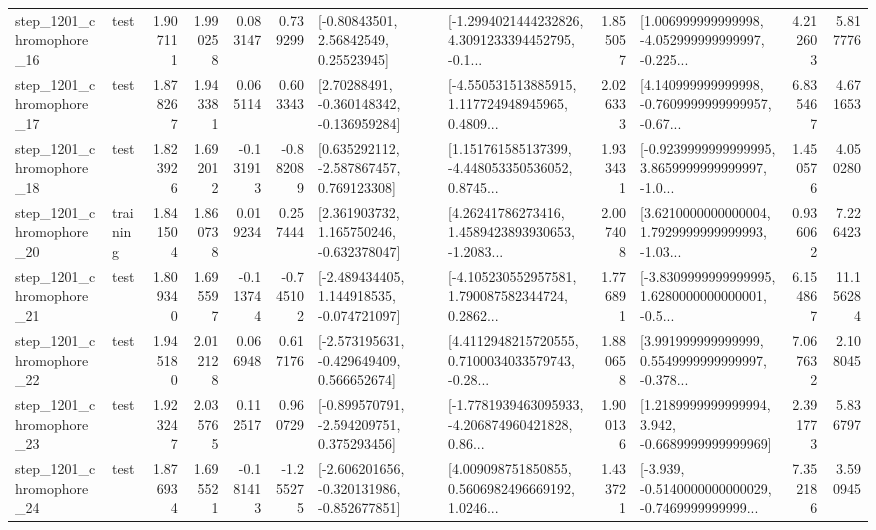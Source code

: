\begin{tabular}{llrrrrllrlrr}
 step\_1201\_chromophore\_16 &      test &      1.907111 &    1.990258 &      0.083147 &  0.739299 &       [-0.80843501, 2.56842549, 0.25523945] &  [-1.2994021444232826, 4.3091233394452795, -0.1... &       1.855057 &  [1.006999999999998, -4.052999999999997, -0.225... &            4.212603 &          5.817776 \\
 step\_1201\_chromophore\_17 &      test &      1.878267 &    1.943381 &      0.065114 &  0.603343 &    [2.70288491, -0.360148342, -0.136959284] &  [-4.550531513885915, 1.117724948945965, 0.4809... &       2.026333 &  [4.140999999999998, -0.7609999999999957, -0.67... &            6.835467 &          4.671653 \\
 step\_1201\_chromophore\_18 &      test &      1.823926 &    1.692012 &     -0.131913 & -0.882089 &    [0.635292112, -2.587867457, 0.769123308] &  [1.151761585137399, -4.448053350536052, 0.8745... &       1.933431 &  [-0.9239999999999995, 3.8659999999999997, -1.0... &            1.450576 &          4.050280 \\
 step\_1201\_chromophore\_20 &  training &      1.841504 &    1.860738 &      0.019234 &  0.257444 &    [2.361903732, 1.165750246, -0.632378047] &  [4.26241786273416, 1.4589423893930653, -1.2083... &       2.007408 &  [3.6210000000000004, 1.7929999999999993, -1.03... &            0.936062 &          7.226423 \\
 step\_1201\_chromophore\_21 &      test &      1.809340 &    1.695597 &     -0.113744 & -0.745102 &   [-2.489434405, 1.144918535, -0.074721097] &  [-4.105230552957581, 1.790087582344724, 0.2862... &       1.776891 &  [-3.8309999999999995, 1.6280000000000001, -0.5... &            6.154867 &         11.156284 \\
 step\_1201\_chromophore\_22 &      test &      1.945180 &    2.012128 &      0.066948 &  0.617176 &   [-2.573195631, -0.429649409, 0.566652674] &  [4.4112948215720555, 0.7100034033579743, -0.28... &       1.880658 &  [3.991999999999999, 0.5549999999999997, -0.378... &            7.067632 &          2.108045 \\
 step\_1201\_chromophore\_23 &      test &      1.923247 &    2.035765 &      0.112517 &  0.960729 &   [-0.899570791, -2.594209751, 0.375293456] &  [-1.7781939463095933, -4.206874960421828, 0.86... &       1.900136 &   [1.2189999999999994, 3.942, -0.6689999999999969] &            2.391773 &          5.836797 \\
 step\_1201\_chromophore\_24 &      test &      1.876934 &    1.695521 &     -0.181413 & -1.255275 &  [-2.606201656, -0.320131986, -0.852677851] &  [4.009098751850855, 0.5606982496669192, 1.0246... &       1.433721 &  [-3.939, -0.5140000000000029, -0.7469999999999... &            7.352186 &          3.590945 \\

\end{tabular}

